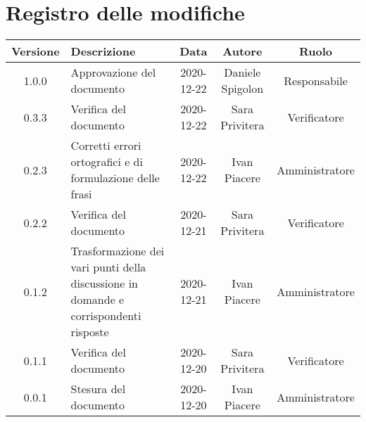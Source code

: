 \section*{Registro delle modifiche}

\begin{center}
	\begin{longtable}{|c|p{5cm}|c|c|c|}
	\hline
	\rowcolor{lighter-grayer}
	\textbf{Versione} & \textbf{Descrizione} & \textbf{Data} & \textbf{Autore} & \textbf{Ruolo} \\
	\hline
	\endfirsthead

	
	1.0.0 & Approvazione del documento & 2020-12-22 & Daniele Spigolon & Responsabile \\
	\hline
	0.3.3 & Verifica del documento & 2020-12-22 & Sara Privitera & Verificatore \\
	\hline
	0.2.3 & Corretti errori ortografici e di formulazione delle frasi & 2020-12-22 & Ivan Piacere & Amministratore \\
	\hline
	0.2.2 & Verifica del documento & 2020-12-21 & Sara Privitera & Verificatore \\
	\hline
	0.1.2 & Trasformazione dei vari punti della discussione in domande e corrispondenti risposte & 2020-12-21 & Ivan Piacere & Amministratore \\
	\hline
	0.1.1 & Verifica del documento & 2020-12-20 & Sara Privitera & Verificatore \\
	\hline
	0.0.1 & Stesura del documento & 2020-12-20 & Ivan Piacere & Amministratore \\
	\hline
	\end{longtable}
\end{center}
